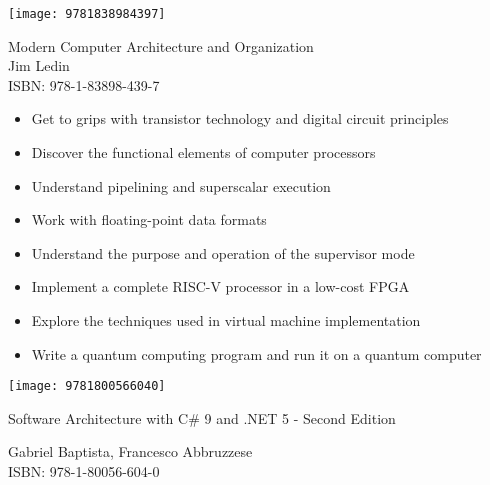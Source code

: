 \begin{flushleft}
\texttt{[image: 9781838984397]}\\

\vspace{0.2 cm}

{\AlegreyaSansMedium Modern Computer Architecture and Organization}\\
\vspace{0.2 cm}
Jim Ledin\\
ISBN: 978-1-83898-439-7\\

\begin{itemize}[nosep]
    \item Get to grips with transistor technology and digital circuit principles
    \item Discover the functional elements of computer processors
    \item Understand pipelining and superscalar execution
    \item Work with floating-point data formats
    \item Understand the purpose and operation of the supervisor mode
    \item Implement a complete RISC-V processor in a low-cost FPGA
    \item Explore the techniques used in virtual machine implementation
    \item Write a quantum computing program and run it on a quantum computer
\end{itemize}

\vspace{0.3 cm}

\texttt{[image: 9781800566040]}\\

\vspace{0.2 cm}

{\AlegreyaSansMedium Software Architecture with C\# 9 and .NET 5 - Second Edition}\\

\vspace{0.2 cm}

Gabriel Baptista, Francesco Abbruzzese\\
ISBN: 978-1-80056-604-0\\


\end{flushleft}
